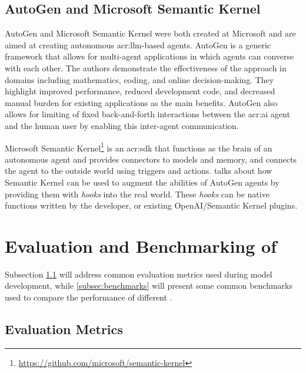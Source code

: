 \subsection{AutoGen and Microsoft Semantic Kernel}\label{subsubsec:microsoft-semantic-kernel}

AutoGen and Microsoft Semantic Kernel were both created at Microsoft and are aimed at creating autonomous \acrshort{acr:llm}-based agents. AutoGen \citep{wuAutoGenEnablingNextGen2023} is a generic framework that allows for multi-agent applications in which agents can converse with each other. The authors demonstrate the effectiveness of the approach in domains including mathematics, coding, and online decision-making. They highlight improved performance, reduced development code, and decreased manual burden for existing applications as the main benefits. AutoGen also allows for limiting of fixed back-and-forth interactions between the \acrshort{acr:ai} agent and the human user by enabling this inter-agent communication.

Microsoft Semantic Kernel\footnote{\url{https://github.com/microsoft/semantic-kernel}} is an \acrshort{acr:sdk} that functions as the brain of an autonomous agent and provides connectors to models and memory, and connects the agent to the outside world using triggers and actions. \cite{maedaAutoGenAgentsMeet2023} talks about how Semantic Kernel can be used to augment the abilities of AutoGen agents by providing them with \textit{hooks} into the real world. These \textit{hooks} can be native functions written by the developer, or existing OpenAI/Semantic Kernel plugins.



\section[Evaluation and Benchmarking of LLMs]{Evaluation and Benchmarking of }\label{sec:benchmarking-and-evaluation}

Subsection \ref{subsec:evaluation-metrics} will address common evaluation metrics used during model development, while \autoref{subsec:benchmarks} will present some common benchmarks used to compare the performance of different .

\subsection{Evaluation Metrics}\label{subsec:evaluation-metrics}


